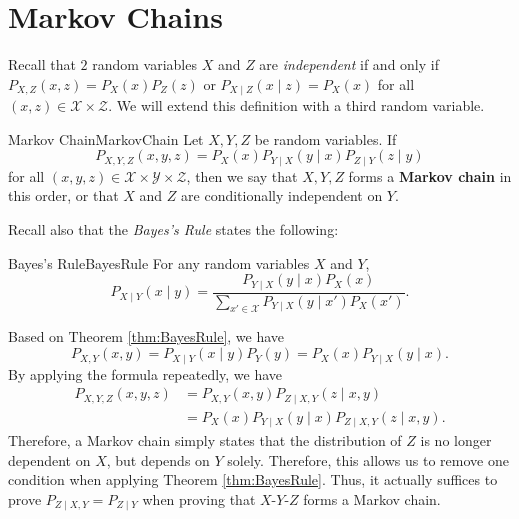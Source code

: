 \documentclass[math, code]{amznotes}
\theoremstyle{remark}
\begin{document}
\section{Markov Chains}
Recall that $2$ random variables $X$ and $Z$ are \textit{independent} if and only if $P_{X, Z}\left(x, z\right) = P_X\left(x\right)P_Z\left(z\right)$ or $P_{X \mid Z}\left(x \mid z\right) = P_X\left(x\right)$ for all $\left(x, z\right) \in \mathcal{X} \times \mathcal{Z}$. We will extend this definition with a third random variable.
\begin{dfnbox}{Markov Chain}{MarkovChain}
    Let $X, Y, Z$ be random variables. If 
    \begin{equation*}
        P_{X, Y, Z}\left(x, y, z\right) = P_X\left(x\right)P_{Y \mid X}\left(y \mid x\right)P_{Z \mid Y}\left(z \mid y\right)
    \end{equation*}
    for all $\left(x, y, z\right) \in \mathcal{X} \times \mathcal{Y} \times \mathcal{Z}$, then we say that $X, Y, Z$ forms a {\color{red} \textbf{Markov chain}} in this order, or that $X$ and $Z$ are conditionally independent on $Y$.
\end{dfnbox}
Recall also that the \textit{Bayes's Rule} states the following:
\begin{thmbox}{Bayes's Rule}{BayesRule}
    For any random variables $X$ and $Y$, 
    \begin{equation*}
        P_{X \mid Y}\left(x \mid y\right) = \frac{P_{Y \mid X}\left(y \mid x\right)P_X\left(x\right)}{\sum_{x' \in \mathcal{X}}P_{Y \mid X}\left(y \mid x'\right)P_X\left(x'\right)}.
    \end{equation*}
\end{thmbox}
Based on Theorem \ref{thm:BayesRule}, we have 
\begin{equation*}
    P_{X, Y}\left(x, y\right) = P_{X \mid Y}\left(x \mid y\right)P_Y\left(y\right) = P_X\left(x\right)P_{Y \mid X}\left(y \mid x\right).
\end{equation*}
By applying the formula repeatedly, we have 
\begin{align*}
    P_{X, Y, Z}\left(x, y, z\right) & = P_{X, Y}\left(x, y\right)P_{Z \mid X, Y}\left(z \mid x, y\right) \\
    & = P_X\left(x\right)P_{Y \mid X}\left(y \mid x\right)P_{Z \mid X, Y}\left(z \mid x, y\right).
\end{align*}
Therefore, a Markov chain simply states that the distribution of $Z$ is no longer dependent on $X$, but depends on $Y$ solely. Therefore, this allows us to remove one condition when applying Theorem \ref{thm:BayesRule}. Thus, it actually suffices to prove $P_{Z \mid X, Y} = P_{Z \mid Y}$ when proving that $X$-$Y$-$Z$ forms a Markov chain.  
 
\end{document}
